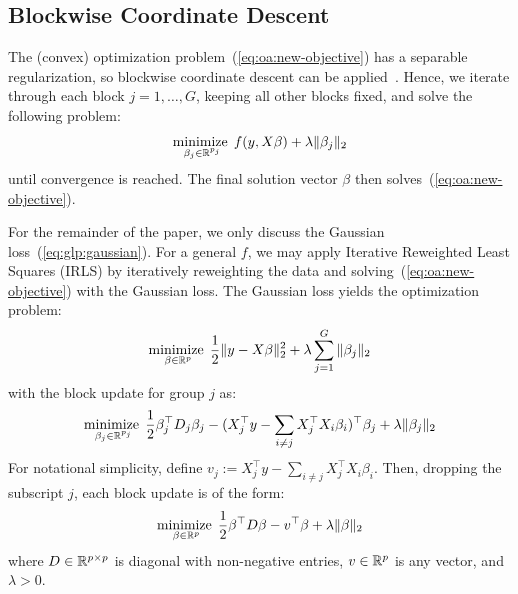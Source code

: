 \subsection{Blockwise Coordinate Descent}\label{ssec:bcd}

The (convex) optimization problem~(\ref{eq:oa:new-objective}) has a separable regularization,
so blockwise coordinate descent can be applied~\cite{tseng:2001}.
Hence, we iterate through each block $j=1,\ldots, G$,
keeping all other blocks fixed, and solve the following problem:
\begin{align}
    \operatorname*{minimize\;}_{\beta_j \in \mathbb{R}^{p_j}}
    f(y, X\beta)
    + \lambda \|\beta_j\|_2
    \label{eq:bcd:block-problem}
\end{align}
until convergence is reached.
The final solution vector $\beta$ then solves~(\ref{eq:oa:new-objective}).

For the remainder of the paper, we only discuss the Gaussian loss~(\ref{eq:glp:gaussian}).
For a general $f$, we may apply Iterative Reweighted Least Squares (IRLS) 
by iteratively reweighting the data 
and solving~(\ref{eq:oa:new-objective}) with the Gaussian loss.
The Gaussian loss yields the optimization problem:
\begin{align*}
    \operatorname*{minimize\;}_{\beta \in \mathbb{R}^p}
    \frac{1}{2} \|y - X \beta\|_2^2 
    + \lambda \sum\limits_{j=1}^G \|\beta_j\|_2
\end{align*}
with the block update for group $j$ as:
\begin{align*}
    \operatorname*{minimize\;}_{\beta_j \in \mathbb{R}^{p_j}}
    \frac{1}{2} \beta_j^\top D_j \beta_j
    - (X_j^\top y - \sum\limits_{i \neq j} X_j^\top X_i \beta_i)^\top \beta_j
    + \lambda \|\beta_j\|_2
\end{align*}
For notational simplicity, define $v_j := X_j^\top y - \sum\limits_{i \neq j} X_j^\top X_i \beta_i$.
Then, dropping the subscript $j$, each block update is of the form:
\begin{align}
    \operatorname*{minimize\;}_{\beta \in \mathbb{R}^p}
    \frac{1}{2} \beta^\top D \beta
    - v^\top \beta
    + \lambda \|\beta\|_2
    \label{eq:bcd:block-update}
\end{align}
where $D \in \mathbb{R}^{p \times p}$ is diagonal with non-negative entries,
$v \in \mathbb{R}^p$ is any vector, and $\lambda > 0$.
